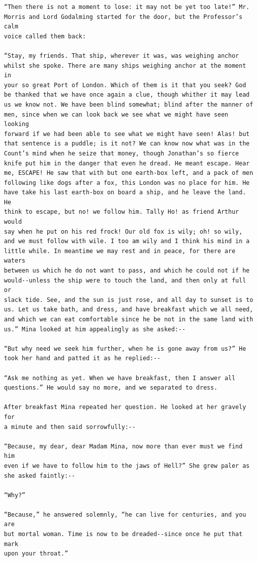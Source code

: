\documentclass{article}
\begin{document}
\begin{verbatim}
“Then there is not a moment to lose: it may not be yet too late!” Mr.
Morris and Lord Godalming started for the door, but the Professor’s calm
voice called them back:

“Stay, my friends. That ship, wherever it was, was weighing anchor
whilst she spoke. There are many ships weighing anchor at the moment in
your so great Port of London. Which of them is it that you seek? God
be thanked that we have once again a clue, though whither it may lead
us we know not. We have been blind somewhat; blind after the manner of
men, since when we can look back we see what we might have seen looking
forward if we had been able to see what we might have seen! Alas! but
that sentence is a puddle; is it not? We can know now what was in the
Count’s mind when he seize that money, though Jonathan’s so fierce
knife put him in the danger that even he dread. He meant escape. Hear
me, ESCAPE! He saw that with but one earth-box left, and a pack of men
following like dogs after a fox, this London was no place for him. He
have take his last earth-box on board a ship, and he leave the land. He
think to escape, but no! we follow him. Tally Ho! as friend Arthur would
say when he put on his red frock! Our old fox is wily; oh! so wily,
and we must follow with wile. I too am wily and I think his mind in a
little while. In meantime we may rest and in peace, for there are waters
between us which he do not want to pass, and which he could not if he
would--unless the ship were to touch the land, and then only at full or
slack tide. See, and the sun is just rose, and all day to sunset is to
us. Let us take bath, and dress, and have breakfast which we all need,
and which we can eat comfortable since he be not in the same land with
us.” Mina looked at him appealingly as she asked:--

“But why need we seek him further, when he is gone away from us?” He
took her hand and patted it as he replied:--

“Ask me nothing as yet. When we have breakfast, then I answer all
questions.” He would say no more, and we separated to dress.

After breakfast Mina repeated her question. He looked at her gravely for
a minute and then said sorrowfully:--

“Because, my dear, dear Madam Mina, now more than ever must we find him
even if we have to follow him to the jaws of Hell?” She grew paler as
she asked faintly:--

“Why?”

“Because,” he answered solemnly, “he can live for centuries, and you are
but mortal woman. Time is now to be dreaded--since once he put that mark
upon your throat.”


\end{verbatim}
\end{document}
